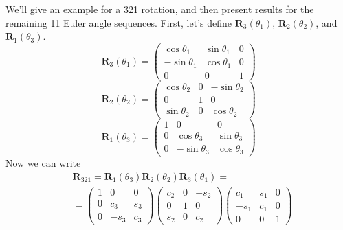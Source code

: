 We'll give an example for a 321 rotation, and then present results
for the remaining 11 Euler angle sequences.  First, let's define
$\mathbf{R}_3(\theta_1)$, $\mathbf{R}_2(\theta_2)$, and
$\mathbf{R}_1(\theta_3)$.
%
\begin{equation}
    \mathbf{R}_3(\theta_1) =  \begin{pmatrix}
      \cos{\theta_1}  & \sin{\theta_1} & 0    \\
      -\sin{\theta_1} & \cos{\theta_1} & 0    \\
      0               & 0              & 1
     \end{pmatrix}
\end{equation}
%
\begin{equation}
    \mathbf{R}_2(\theta_2) =  \begin{pmatrix}
      \cos{\theta_2}  & 0              & -\sin{\theta_2}    \\
      0               & 1              & 0    \\
      \sin{\theta_2}  & 0              & \cos{\theta_2}
     \end{pmatrix}
\end{equation}
%
\begin{equation}
    \mathbf{R}_1(\theta_3) =  \begin{pmatrix}
      1               & 0                & 0    \\
      0               & \cos{\theta_3}   & \sin{\theta_3}    \\
      0               & -\sin{\theta_3}  & \cos{\theta_3}
     \end{pmatrix}
\end{equation}
%
Now we can write
%
\begin{eqnarray}
       &\mathbf{R}_{321} =  \mathbf{R}_1(\theta_3)\mathbf{R}_2(\theta_2)\mathbf{R}_3(\theta_1) = \nonumber\\
      &=         \begin{pmatrix}
      1               & 0                & 0    \\
      0               & c_3   & s_3    \\
      0               & -s_3  & c_3
     \end{pmatrix}
      \begin{pmatrix}
      c_2  & 0              & -s_2    \\
      0               & 1              & 0    \\
      s_2  & 0              & c_2
     \end{pmatrix}
     \begin{pmatrix}
      c_1   & s_1 & 0    \\
      -s_1  & c_1 & 0    \\
      0               & 0              & 1
     \end{pmatrix}\nonumber\\
\end{eqnarray}
